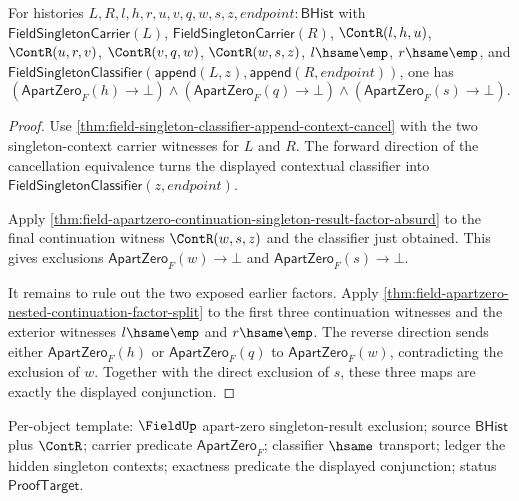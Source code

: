 \begin{theorem}
\label{thm:field-apartzero-two-tail-contextual-singleton-result-exclusion}
For histories $L,R,l,h,r,u,v,q,w,s,z,endpoint:\mathsf{BHist}$ with
$\mathsf{FieldSingletonCarrier}(L)$, $\mathsf{FieldSingletonCarrier}(R)$,
$\ContR(l,h,u)$, $\ContR(u,r,v)$, $\ContR(v,q,w)$, $\ContR(w,s,z)$,
$l\hsame\emp$, $r\hsame\emp$, and
$\mathsf{FieldSingletonClassifier}(\mathsf{append}(L,z),\mathsf{append}(R,endpoint))$,
one has
$$
(\mathsf{ApartZero}_F(h)\to\bot)
\land
(\mathsf{ApartZero}_F(q)\to\bot)
\land
(\mathsf{ApartZero}_F(s)\to\bot).
$$
\end{theorem}
\begin{proof}
Use \autoref{thm:field-singleton-classifier-append-context-cancel} with the
two singleton-context carrier witnesses for $L$ and $R$. The forward direction
of the cancellation equivalence turns the displayed contextual classifier into
$\mathsf{FieldSingletonClassifier}(z,endpoint)$.

Apply
\autoref{thm:field-apartzero-continuation-singleton-result-factor-absurd} to
the final continuation witness $\ContR(w,s,z)$ and the classifier just
obtained. This gives exclusions
$\mathsf{ApartZero}_F(w)\to\bot$ and
$\mathsf{ApartZero}_F(s)\to\bot$.

It remains to rule out the two exposed earlier factors. Apply
\autoref{thm:field-apartzero-nested-continuation-factor-split} to the
first three continuation witnesses and the exterior witnesses $l\hsame\emp$
and $r\hsame\emp$. The reverse direction sends either
$\mathsf{ApartZero}_F(h)$ or $\mathsf{ApartZero}_F(q)$ to
$\mathsf{ApartZero}_F(w)$, contradicting the exclusion of $w$. Together with
the direct exclusion of $s$, these three maps are exactly the displayed
conjunction.
\end{proof}

Per-object template: $\FieldUp$ apart-zero singleton-result exclusion; source
$\mathsf{BHist}$ plus $\ContR$; carrier predicate $\mathsf{ApartZero}_F$;
classifier $\hsame$ transport; ledger the hidden singleton contexts; exactness
predicate the displayed conjunction; status $\mathsf{ProofTarget}$.

